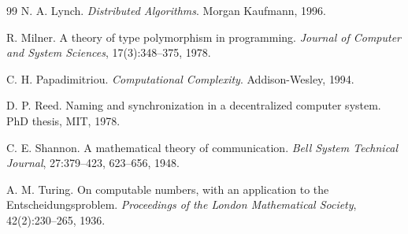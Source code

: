 \documentclass[11pt]{article}
\begin{document}
\begin{thebibliography}{99}
N. A. Lynch.
\textit{Distributed Algorithms}.
Morgan Kaufmann, 1996.

R. Milner.
A theory of type polymorphism in programming.
\textit{Journal of Computer and System Sciences}, 17(3):348--375, 1978.

C. H. Papadimitriou.
\textit{Computational Complexity}.
Addison-Wesley, 1994.

D. P. Reed.
Naming and synchronization in a decentralized computer system.
PhD thesis, MIT, 1978.

C. E. Shannon.
A mathematical theory of communication.
\textit{Bell System Technical Journal}, 27:379--423, 623--656, 1948.

A. M. Turing.
On computable numbers, with an application to the Entscheidungsproblem.
\textit{Proceedings of the London Mathematical Society}, 42(2):230--265, 1936.

\end{thebibliography}
\end{document}
